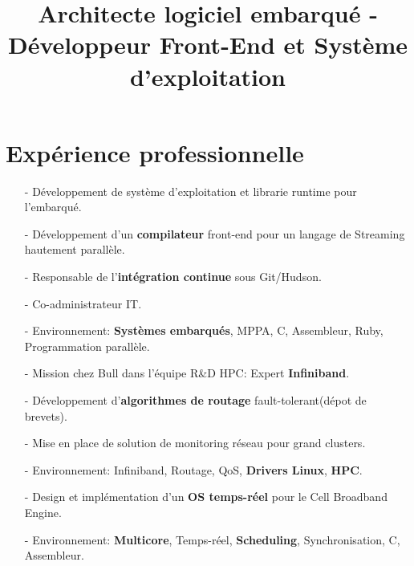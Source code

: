 \documentclass[10pt,a4paper]{moderncv}
\title{Architecte logiciel embarqué - Développeur Front-End et Système d'exploitation}
\begin{document}
\maketitle
\section{Expérience professionnelle}
{
\begin{itemize}
\item[-]{Développement de système d'exploitation et librarie runtime pour l'embarqué.}
\item[-]{Développement d'un \textbf{compilateur} front-end pour un langage de Streaming hautement parallèle.}
\item[-]{Responsable de l'\textbf{intégration continue} sous Git/Hudson.}
\item[-]{Co-administrateur IT.}
\item[-]{Environnement: \textbf{Systèmes embarqués}, MPPA, C, Assembleur, Ruby, Programmation parallèle.}
\end{itemize}
}

{
\begin{itemize}
\item[-]{Mission chez Bull dans l'équipe R\&D HPC: Expert \textbf{Infiniband}.}
\item[-]{Développement d'\textbf{algorithmes de routage} fault-tolerant(dépot de brevets).}
\item[-]{Mise en place de solution de monitoring réseau pour grand clusters.}
\item[-]{Environnement: Infiniband, Routage, QoS, \textbf{Drivers Linux}, \textbf{HPC}.}
\end{itemize}
}

{
\begin{itemize}
\item[-]{Design et implémentation d'un \textbf{OS temps-réel} pour le Cell Broadband Engine.}
\item[-]{Environnement: \textbf{Multicore}, Temps-réel, \textbf{Scheduling}, Synchronisation, C, Assembleur.}
\end{itemize}
}
\end{document}
